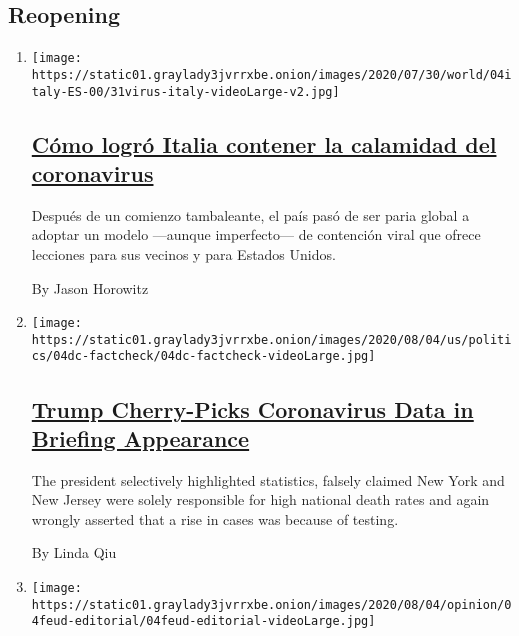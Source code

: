 \hypertarget{reopening}{%
\subsection{Reopening}\label{reopening}}

\begin{enumerate}
\def\labelenumi{\arabic{enumi}.}
\item
  \texttt{[image: https://static01.graylady3jvrrxbe.onion/images/2020/07/30/world/04italy-ES-00/31virus-italy-videoLarge-v2.jpg]}

  \hypertarget{cuxf3mo-logruxf3-italia-contener-la-calamidad-del-coronavirus}{%
  \subsection{\texorpdfstring{\href{/es/2020/08/05/espanol/mundo/italia-reapertura-coronavirus.html}{Cómo
  logró Italia contener la calamidad del
  coronavirus}}{Cómo logró Italia contener la calamidad del coronavirus}}\label{cuxf3mo-logruxf3-italia-contener-la-calamidad-del-coronavirus}}

  Después de un comienzo tambaleante, el país pasó de ser paria global a
  adoptar un modelo ---aunque imperfecto--- de contención viral que
  ofrece lecciones para sus vecinos y para Estados Unidos.

  By Jason Horowitz
\item
  \texttt{[image: https://static01.graylady3jvrrxbe.onion/images/2020/08/04/us/politics/04dc-factcheck/04dc-factcheck-videoLarge.jpg]}

  \hypertarget{trump-cherry-picks-coronavirus-data-in-briefing-appearance}{%
  \subsection{\texorpdfstring{\href{/2020/08/04/us/politics/coronavirus-trump-data-briefing.html}{Trump
  Cherry-Picks Coronavirus Data in Briefing
  Appearance}}{Trump Cherry-Picks Coronavirus Data in Briefing Appearance}}\label{trump-cherry-picks-coronavirus-data-in-briefing-appearance}}

  The president selectively highlighted statistics, falsely claimed New
  York and New Jersey were solely responsible for high national death
  rates and again wrongly asserted that a rise in cases was because of
  testing.

  By Linda Qiu
\item
  \texttt{[image: https://static01.graylady3jvrrxbe.onion/images/2020/08/04/opinion/04feud-editorial/04feud-editorial-videoLarge.jpg]}


\end{enumerate}
